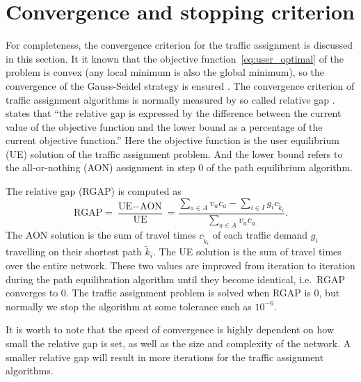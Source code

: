 \section{Convergence and stopping criterion} \label{sec:convergence}
For completeness, the convergence criterion for the traffic assignment is discussed in this section.
It it known that the objective function~\eqref{eq:user_optimal} of the problem is convex (any local minimum is also the global minimum),
so the convergence of the Gauss-Seidel strategy is ensured \citep{Florian2008}.
The convergence criterion of traffic assignment algorithms is normally measured by so called relative gap \citep{Rose}.
\cite{Rose} states that ``the relative gap is expressed by the difference between the current value of 
the objective function and the lower bound as a percentage of the current objective function.''
Here the objective function is the user equilibrium (UE) solution of the traffic assignment problem.
And the lower bound refers to the all-or-nothing (AON) assignment in step 0 of the path equilibrium algorithm.

The relative gap (RGAP) is computed as
\begin{equation}
    \text{RGAP} = \frac{\text{UE} - \text{AON}}{\text{UE}} = \frac{\sum_{a \in A} v_a c_a - \sum_{i \in I} g_i c_{\tilde{k}_i}}{\sum_{a \in A} v_a c_a}.
\end{equation}
The AON solution is the sum of travel times $c_{\tilde{k}_i}$ of each traffic demand $g_i$ travelling on their shortest path $\tilde{k}_i$.
The UE solution is the sum of travel times over the entire network.
These two values are improved from iteration to iteration during the path equilibration algorithm until they become identical, i.e.\ RGAP converges to 0.
The traffic assignment problem is solved when RGAP is 0,
but normally we stop the algorithm at some tolerance such as $10^{-6}$.

It is worth to note that the speed of convergence is highly dependent on how small the relative gap is set,
as well as the size and complexity of the network.
A smaller relative gap will result in more iterations for the traffic assignment algorithms.
